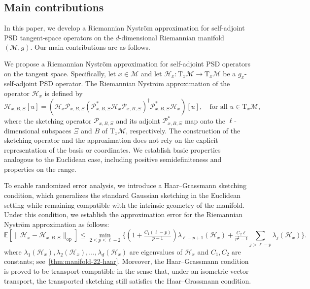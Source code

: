\documentclass[final,onefignum,onetabnum]{siamart250211}
\begin{document}
\subsection{Main contributions}
In this paper, we develop a Riemannian Nystr\"om approximation for self-adjoint PSD tangent-space operators on the $d$-dimensional Riemannian manifold $(\mathcal{M}, g)$.
Our main contributions are as follows.

We propose a Riemannian Nystr\"om approximation for self-adjoint PSD operators on the tangent space.
Specifically, let $x \in \mathcal{M}$ and let $\mathcal{H}_x : \mathrm{T}_x\mathcal{M} \to \mathrm{T}_x\mathcal{M}$ be a $g_x$-self-adjoint PSD operator. The Riemannian Nystr\"om approximation of the operator $\mathcal{H}_x$ is defined by
\[
\mathcal{H}_{x, B, \Xi}[u]=\left(\mathcal{H}_x \mathcal{P}_{x, B, \Xi}\left(\mathcal{P}_{x, B, \Xi}^{*} \mathcal{H}_x \mathcal{P}_{x, B, \Xi}\right)^{\dagger} \mathcal{P}_{x, B, \Xi}^{*} \mathcal{H}_x\right)[u], \quad  \text{for all } u \in \mathrm{T}_x \mathcal{M},
\]
where the sketching operator $\mathcal{P}_{x, B, \Xi}$ and its adjoint $\mathcal{P}_{x, B, \Xi}^*$ map onto the $\ell$-dimensional subspaces $\Xi$ and $B$ of $\mathrm{T}_x\mathcal{M}$, respectively. The construction of the sketching operator and the approximation does not rely on the explicit representation of the basis or coordinates.
We establish basic properties analogous to the Euclidean case, including positive semidefiniteness and properties on the range.

To enable randomized error analysis, we introduce a Haar--Grassmann sketching condition, which generalizes the standard Gaussian sketching in the Euclidean setting while remaining compatible with the intrinsic geometry of the manifold.
Under this condition, we establish the approximation error for the Riemannian Nystr\"om approximation as follows:
  \[
  \mathbb E\left[ \big\|\mathcal{H}_x-\mathcal{H}_{x, B, \Xi}\big\|_{\mathrm{op}} \right]
  \le
  \min_{2\le p\le \ell-2}
\Bigg\{\left(1+\tfrac{C_1(\ell-p)}{p-1}\right)\lambda_{\ell-p+1}(\mathcal{H}_x) +\tfrac{C_2\ell}{p^{2}-1}\sum_{j>\ell-p}\lambda_j(\mathcal{H}_x)
  \Bigg\}.
  \]
where $\lambda_{1}(\mathcal{H}_x), \lambda_{2}(\mathcal{H}_x), \ldots, \lambda_{d}(\mathcal{H}_x)$ are eigenvalues of $\mathcal{H}_x$ and $C_1, C_2$ are constants; see~\cref{thm:manifold-22-haar}.
Moreover, the Haar--Grassmann condition is proved to be transport-compatible in the sense that, under an isometric vector transport, the transported sketching still satisfies the Haar--Grassmann condition.
\end{document}

